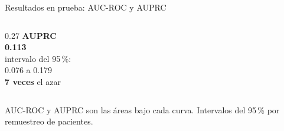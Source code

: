\documentclass[aspectratio=169,10pt]{beamer}
\newcommand{\cifra}[1]{{\fontsize{24}{26}\selectfont\bfseries\color{azulfi}#1}}
\newcommand{\nota}[1]{{\footnotesize\color{black!65}#1}}
\begin{document}
\begin{frame}{Resultados en prueba: AUC-ROC y AUPRC}
\begin{columns}[c]
\begin{column}{0.27\textwidth}
      {\small\textbf{AUPRC}}\\[0.2em]
      \cifra{0.113}\\[0.1em]
      \nota{intervalo del 95\,\%:\\0.076 a 0.179}\\[0.9em]
      {\small \textbf{7 veces} el azar}
    \end{column}
  \end{columns}
  \vspace{0.2em}
  \begin{center}
    \nota{AUC-ROC y AUPRC son las áreas bajo cada curva. Intervalos del 95\,\% por remuestreo de pacientes.}
  \end{center}
\end{frame}

\end{document}
